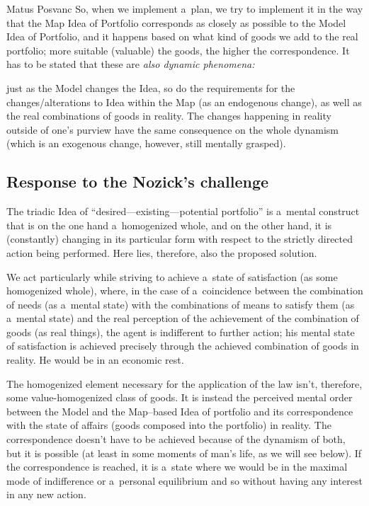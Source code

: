 \begin{artengenv}{Matus Posvanc}
So, when we implement a~plan, we try to implement it in the way that the Map Idea of Portfolio corresponds as closely as possible to the Model Idea of Portfolio, and it happens based on what kind of goods we add to the real portfolio; more suitable (valuable) the goods, the higher the correspondence. It has to be stated that these are \textit{also dynamic phenomena:}

just as the Model changes the Idea, so do the requirements for the changes/alterations to Idea within the Map (as an endogenous change), as well as the real combinations of goods in reality. The changes happening in reality outside of one's purview have the same consequence on the whole dynamism (which is an exogenous change, however, still mentally grasped).



\subsection*{Response to the Nozick's challenge}



The triadic Idea of ``desired---existing---potential portfolio'' is a~mental construct that is on the one hand a~homogenized whole, and on the other hand, it is (constantly) changing in its particular form with respect to the strictly directed action being performed. Here lies, therefore, also the proposed solution.



We act particularly while striving to achieve a~state of satisfaction (as some homogenized whole), where, in the case of a~coincidence between the combination of needs (as a~mental state) with the combinations of means to satisfy them (as a~mental state) and the real perception of the achievement of the combination of goods (as real things), the agent is indifferent to further action; his mental state of satisfaction is achieved precisely through the achieved combination of goods in reality. He would be in an economic rest.



The homogenized element necessary for the application of the law isn't, therefore, some value-homogenized class of goods. It is instead the perceived mental order between the Model and the Map–based Idea of portfolio and its correspondence with the state of affairs (goods composed into the portfolio) in reality. The correspondence doesn't have to be achieved because of the dynamism of both, but it is possible (at least in some moments of man's life, as we will see below). If the correspondence is reached, it is a~state where we would be in the maximal mode of indifference or a~personal equilibrium and so without having any interest in any new action.




\end{artengenv}
